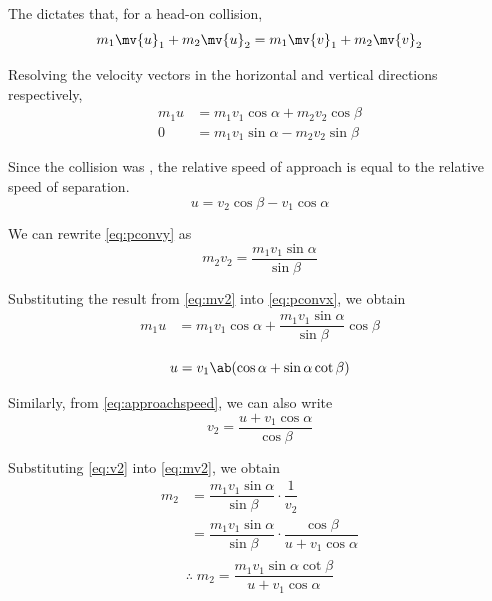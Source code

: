 The  dictates that, for a
head-on collision,
\begin{equation}
	m_1\mv{u}_1 + m_2\mv{u}_2 = m_1\mv{v}_1 + m_2\mv{v}_2
\end{equation}

Resolving the velocity vectors in the horizontal and vertical directions respectively,
\begin{align}
	\label{eq:pconvx}
	m_1{u} & = m_1{v}_1 \cos\alpha + m_2{v}_2 \cos \beta  \\
	0      & = m_1{v}_1 \sin \alpha - m_2{v}_2 \sin \beta
	\label{eq:pconvy}
\end{align}

Since the collision was , the relative speed of approach
is equal to the relative speed of separation.
\begin{equation}
	{u} = {v}_2 \cos \beta - {v}_1 \cos \alpha
	\label{eq:approachspeed}
\end{equation}

We can rewrite \cref{eq:pconvy} as
\begin{equation}
	m_2{v}_2 = \dfrac{m_1{v}_1\sin\alpha}{\sin\beta}
	\label{eq:mv2}
\end{equation}

Substituting the result from \cref{eq:mv2} into \cref{eq:pconvx}, we obtain
\begin{align*}
	m_1{u} & = m_1{v}_1\cos\alpha +
	\dfrac{m_1{v_1}\sin\alpha}{\sin\beta}\cos\beta \\
\end{align*}
\begin{equation}
	{u} = {v}_1\ab(\cos\alpha + \sin\alpha\cot\beta)
	\label{eq:uv1}
\end{equation}

Similarly, from \cref{eq:approachspeed}, we can also write
\begin{equation}
	{v}_2 = \dfrac{{u} + {v}_1\cos\alpha}{\cos\beta}
	\label{eq:v2}
\end{equation}

Substituting \cref{eq:v2} into \cref{eq:mv2}, we obtain
\begin{align*}
	m_2 & = \dfrac{m_1{v}_1\sin\alpha}{\sin\beta} \cdot \dfrac{1}{{v}_2} \\
	    & =
	\dfrac{m_1{v}_1\sin\alpha}{\sin\beta}\cdot\dfrac{\cos\beta}{{u}
	+ {v}_1\cos\alpha}                                                   \\
\end{align*}
\begin{equation}
	\therefore\; m_2
	=\dfrac{m_1{v}_1\sin\alpha\cot\beta}{{u}+{v}_1\cos\alpha}
	\label{eq:m2}
\end{equation}

